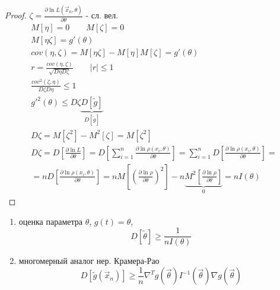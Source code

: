 \documentclass{article}
\begin{document}
\begin{proof}
  $\zeta=\frac{\partial \ln L(\vec{x}_n,\theta)}{\partial \theta}$ - сл. вел.
  \begin{gather*}
    M[\eta]=0 \qquad M[\zeta]=0 \\
    M[\eta\zeta]=g'(\theta) \\ 
    cov(\eta,\zeta)=M[\eta\zeta]-M[\eta]M[\zeta]=g'(\theta) \\ 
    r=\frac{cov(\eta,\zeta)}{\sqrt{D\eta D\zeta}} \qquad |r|\le 1 \\ 
    \frac{cov^{2}(\zeta,\eta)}{D\zeta D\eta} \le 1 \\ 
    g'^{2}(\theta) \le D\zeta \underbrace{D[\tilde{g}]}_{D[\tilde{g}]} \\ 
    D\zeta=M[\zeta^{2}]-M^{2}[\zeta]=M[\zeta^{2}] \\ 
    D\zeta=D\left[\frac{\partial\ln L}{\partial\theta}\right] 
    =D\left[\sum_{i=1}^{n}\frac{\partial\ln \rho(x_i,\theta)}{\partial\theta}\right]
    =\sum_{i=1}^{n}D\left[\frac{\partial\ln \rho(x_i,\theta)}{\partial\theta}\right]= \\
    =nD\left[\frac{\partial\ln \rho(x_i,\theta)}{\partial\theta}\right]
    =nM\left[\left(\frac{\partial \ln \rho}{\partial\theta}\right)^{2}\right] - n\underbrace{M^{2}\left[\frac{\partial \ln \rho}{\partial \theta}\right]}_{0}=nI(\theta)
  \end{gather*}
\end{proof}
\begin{corollary}
  \phantom{.}

  \begin{enumerate}
    \item оценка параметра $\theta$, $g(t)=\theta$,
      \[
        D[\tilde{\theta}]\ge\frac{1}{nI(\theta)}
      \]
    \item многомерный аналог нер. Крамера-Рао
      \[
        D[\tilde{g}(\vec{x}_n)]\ge \frac{1}{n}\nabla^{T}g(\vec{\theta})I^{-1}(\vec{\theta})\nabla g(\vec{\theta})
      \]
  \end{enumerate}
\end{corollary}
\end{document}
